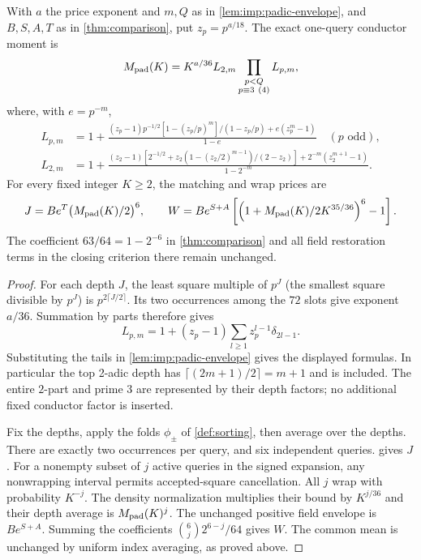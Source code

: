 \begin{proposition}
\label{prop:imp:padic-price}\label{prop:oct24-index-cost}
With $a$ the price exponent and $m,Q$ as in
\cref{lem:imp:padic-envelope}, and $B,S,A,T$ as in
\cref{thm:comparison}, put $z_p=p^{a/18}$. The exact one-query
conductor moment is
\[
 M_{\rm pad}(K)=K^{a/36}L_{2,m}
       \prod_{\substack{p<Q\\p\equiv3\ (4)}}L_{p,m},
\]
where, with $e=p^{-m}$,
\begin{align*}
 L_{p,m}&=1+\frac{(z_p-1)p^{-1/2}
                    [1-(z_p/p)^m]/(1-z_p/p)
                       +e(z_p^m-1)}{1-e}\quad(p\text{ odd}),\\
 L_{2,m}&=1+\frac{(z_2-1)
           [2^{-1/2}+z_2(1-(z_2/2)^{m-1})/(2-z_2)]
                  +2^{-m}(z_2^{m+1}-1)}{1-2^{-m}}.
\end{align*}
For every fixed integer $K\ge2$, the matching and wrap prices are
\begin{equation}\label{eq:oct24-index-cost}
 J=Be^T\bigl(M_{\rm pad}(K)/2\bigr)^6,\qquad
 W=Be^{S+A}\left[\left(1+\frac{M_{\rm pad}(K)}
                                  {2K^{35/36}}\right)^6-1\right].
\end{equation}
The coefficient $63/64=1-2^{-6}$ in \cref{thm:comparison} and all field restoration terms in the closing criterion there remain unchanged.
\end{proposition}
\begin{proof}
For each depth $J$, the least square multiple of $p^J$ (the
smallest square divisible by $p^J$) is $p^{2\lceil J/2\rceil}$.  Its two occurrences among the
$72$ slots give exponent $a/36$.  Summation by parts therefore
gives
\[
 L_{p,m}=1+(z_p-1)\sum_{l\ge1}z_p^{l-1}\delta_{2l-1}.
\]
Substituting the tails in \cref{lem:imp:padic-envelope} gives
the displayed formulas.  In particular the top 2-adic depth
has $\lceil(2m+1)/2\rceil=m+1$ and is included.  The entire $2$-part and prime $3$ are represented by their depth
factors; no additional fixed conductor factor is inserted.

Fix the depths, apply the folds $\phi_\pm$ of \cref{def:sorting}, then average over the depths.
There are exactly two occurrences per query, and six independent
queries.   gives $J$.  For a nonempty
subset of $j$ active queries in the signed expansion, any
nonwrapping interval permits accepted-square cancellation.  All
$j$ wrap with probability $K^{-j}$.  The density normalization multiplies their bound by $K^{j/36}$ and their depth average is $M_{\rm pad}(K)^j$.
The unchanged positive field envelope is $Be^{S+A}$.  Summing
the coefficients $\binom6j2^{6-j}/64$ gives $W$.  The common
mean is unchanged by uniform index averaging, as proved above.
\end{proof}


